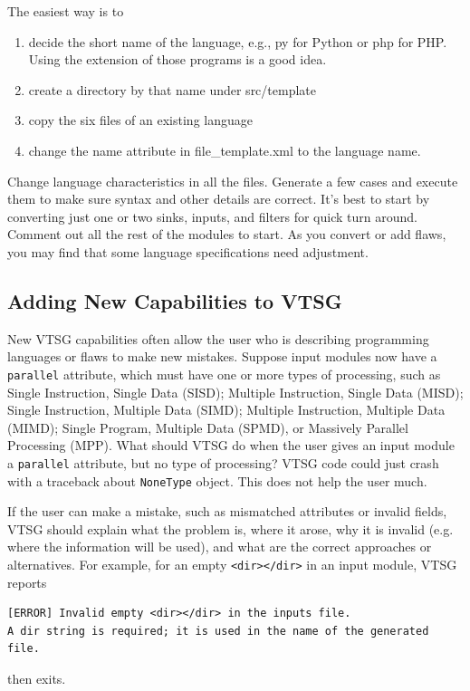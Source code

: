 The easiest way is to
\begin{enumerate}[nosep]
\item decide the short name of the language, e.g., py for Python or php for
  PHP.  Using the extension of those programs is a good idea.
\item create a directory by that name under src/template
\item copy the six files of an existing language
\item change the name attribute in file\_template.xml to the language name.
\end{enumerate}
Change language characteristics in all the files.  Generate a few cases and
execute them to make sure syntax and other details are correct.  It's best to
start by converting just one or two sinks, inputs, and filters for quick turn around.
Comment out all the rest of the modules to start.
As you convert or add flaws, you may find that some language specifications need
adjustment.


\subsection{Adding New Capabilities to VTSG}

New VTSG capabilities often allow the user who is describing programming languages or
flaws to make new mistakes.  Suppose input modules now have a \verb|parallel|
attribute, which must have one or more types of processing, such as Single
Instruction, Single Data (SISD); Multiple Instruction, Single Data (MISD); Single
Instruction, Multiple Data (SIMD); Multiple Instruction, Multiple Data (MIMD); Single
Program, Multiple Data (SPMD), or Massively Parallel Processing (MPP).  What should
VTSG do when the user gives an input module a \verb|parallel| attribute, but no type
of processing?  VTSG code could just crash with a traceback about \verb|NoneType|
object.  This does not help the user much.

If the user can make a mistake, such as mismatched attributes or invalid fields, VTSG
should explain what the problem is, where it arose, why it is invalid (e.g. where the
information will be used), and what are the correct approaches or alternatives.  For
example, for an empty \verb|<dir></dir>| in an input module, VTSG reports
\begin{verbatim}
[ERROR] Invalid empty <dir></dir> in the inputs file.
A dir string is required; it is used in the name of the generated file.
\end{verbatim}
then exits.

